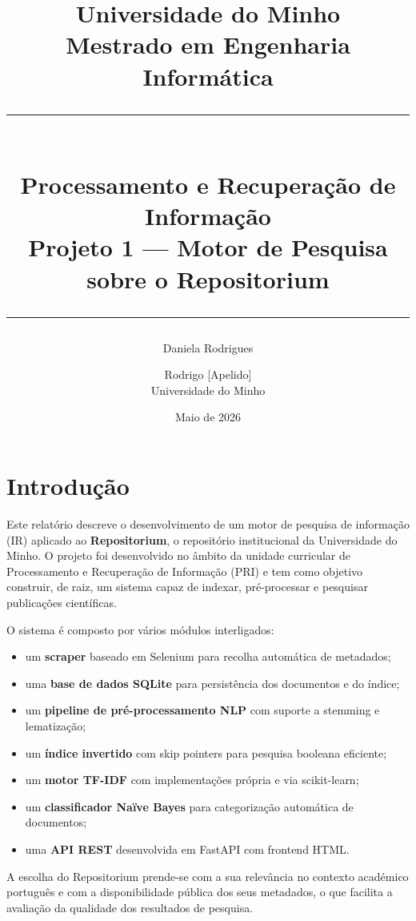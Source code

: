 \documentclass[12pt,a4paper]{article}
\title{
    \vspace{-1cm}
    {\large Universidade do Minho}\\[0.3cm]
    {\large Mestrado em Engenharia Informática}\\[0.3cm]
    \rule{\linewidth}{0.4pt}\\[0.5cm]
    {\LARGE \textbf{Processamento e Recuperação de Informação}}\\[0.3cm]
    {\Large Projeto 1 --- Motor de Pesquisa sobre o Repositorium}\\[0.3cm]
    \rule{\linewidth}{0.4pt}
}
\author{
    Daniela Rodrigues \and Rodrigo [Apelido]\\[0.2cm]
    \small Universidade do Minho
}
\date{Maio de 2026}
\begin{document}

\maketitle
\thispagestyle{empty}
\newpage

\tableofcontents
\newpage

\section{Introdução}

Este relatório descreve o desenvolvimento de um motor de pesquisa de informação (IR) aplicado ao \textbf{Repositorium}, o repositório institucional da Universidade do Minho. O projeto foi desenvolvido no âmbito da unidade curricular de Processamento e Recuperação de Informação (PRI) e tem como objetivo construir, de raiz, um sistema capaz de indexar, pré-processar e pesquisar publicações científicas.

O sistema é composto por vários módulos interligados:
\begin{itemize}
    \item um \textbf{scraper} baseado em Selenium para recolha automática de metadados;
    \item uma \textbf{base de dados SQLite} para persistência dos documentos e do índice;
    \item um \textbf{pipeline de pré-processamento NLP} com suporte a stemming e lematização;
    \item um \textbf{índice invertido} com skip pointers para pesquisa booleana eficiente;
    \item um \textbf{motor TF-IDF} com implementações própria e via scikit-learn;
    \item um \textbf{classificador Naïve Bayes} para categorização automática de documentos;
    \item uma \textbf{API REST} desenvolvida em FastAPI com frontend HTML.
\end{itemize}

A escolha do Repositorium prende-se com a sua relevância no contexto académico português e com a disponibilidade pública dos seus metadados, o que facilita a avaliação da qualidade dos resultados de pesquisa.

\end{document}
